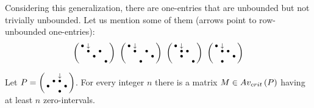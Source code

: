 Considering this generalization, there are one-entries that are unbounded but not trivially unbounded. Let us mention some of them (arrows point to row-unbounded one-entries):
$$\smm{\bullet&\downarrow& & & \\ &\bullet& &\bullet& \\ & &\bullet& & \\ & & & &\bullet}\ \smm{\bullet&\downarrow& & & \\ &\bullet& &\bullet& \\ & & & &\bullet\\ & &\bullet& & }\ \smm{\bullet&\downarrow& & \\ &\bullet&\bullet& \\ &\bullet& & \\ & & &\bullet}\ \smm{\bullet&\downarrow& & \\ &\bullet&\bullet& \\ & & &\bullet\\ &\bullet& & }$$
\begin{prop}
Let $P=\left(\begin{smallmatrix} & &\downarrow& \\ &\bullet&\bullet& \\\bullet& & &\bullet\\ & &\bullet& \end{smallmatrix}\right)$. For every integer $n$ there is a matrix $M\in Av_{crit}\left(P\right)$ having at least $n$ zero-intervals.
\end{prop}
